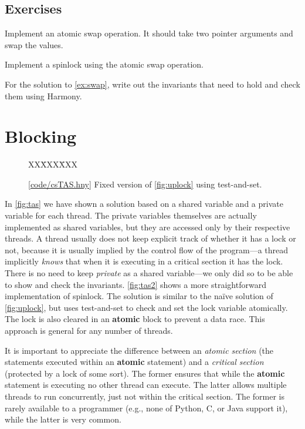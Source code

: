 \documentclass{report}
\newcommand{\harmonysource}[1]{
\begin{tabbing}
XX\=XXX\=XXX\kill
    
\end{tabbing}
}
\newcommand{\harmonylink}[1]{%
[\href{https://harmony.cs.cornell.edu/#1}{\underline{#1}}]%
}
\newenvironment{code}{
\tcolorbox
}{
\endtcolorbox
}
\begin{document}
\section*{Exercises}
\begin{problems}
\item Implement an atomic swap operation.  It should take two pointer arguments
and swap the values.
\item \label{ex:swap} Implement a spinlock using the atomic swap operation.
\item For the solution to \autoref{ex:swap},
write out the invariants that need to hold and check them using Harmony.
\end{problems}

\chapter{Blocking}
\label{ch:synch}
%
%

\begin{figure}
\begin{code}
\harmonysource{csTAS}
\end{code}
\caption{\harmonylink{code/csTAS.hny} Fixed version of \autoref{fig:uplock} using test-and-set.}
\label{fig:tas2}
\end{figure}

In \autoref{fig:tas} we have shown a solution based on a shared
variable and a private variable for each thread.   The private
variables themselves are actually implemented as shared variables,
but they are accessed only by their respective threads.
A thread usually does not keep explicit track of whether it has a lock
or not, because it is usually implied by the control flow of the program---a
thread implicitly \emph{knows} that when it is executing in a critical
section it has the lock.
There is no need to keep \textit{private} as a shared
variable---we only did so to be able to show and check the invariants.
\autoref{fig:tas2} shows a more straightforward implementation of spinlock.
The solution is similar to the na\"{i}ve solution of \autoref{fig:uplock},
but uses test-and-set to check and set the lock variable atomically.
The lock is also cleared in an \textbf{atomic} block to prevent a data race.
This approach is general for any number of threads.

It is important to appreciate the difference between an
\emph{atomic section} (the statements executed within an
\textbf{atomic} statement) and a \emph{critical section}
(protected by a lock of some sort).
The former ensures that while the
\textbf{atomic} statement is executing no other thread can execute.
The latter allows multiple threads to run concurrently,
just not within the critical section.
The former is rarely available to a programmer (e.g., none of
Python, C, or Java support it), while the latter
is very common.
\end{document}
